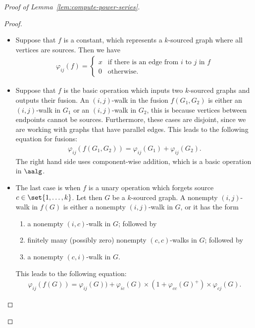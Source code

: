 \begin{proof}[Proof of Lemma~\ref{lem:compute-power-series}]
\begin{proof}
            \begin{itemize}
                \item Suppose that $f$ is a constant, which represents a  $k$-sourced graph where all vertices are sources. Then we have 
                \begin{align*}
                \varphi_{ij}(f) = \begin{cases}
                    x & \text{if there is an edge from $i$ to $j$ in $f$}\\
                    0 & \text{otherwise.}
                \end{cases}
                \end{align*}
                \item Suppose that $f$ is the  basic operation which inputs two $k$-sourced graphs and outputs their fusion.  
                An $(i,j)$-walk in the fusion $f(G_1,G_2)$ is either an $(i,j)$-walk in $G_1$ or an $(i,j)$-walk in $G_2$, this is because vertices between endpoints cannot be sources. Furthermore, these cases are disjoint, since we are working with graphs that have parallel edges.
  		This leads to the following equation for fusions:
                \begin{align*}
					\varphi_{ij}(f(G_1, G_2)) = \varphi_{ij}(G_1) + \varphi_{ij}(G_2).
                \end{align*}
                The right hand side uses component-wise addition, which is a basic operation in $\aalg$.
                \item The last case is when $f$ is a unary operation which forgets  source $c \in \set{1,\ldots,k}$.  Let then $G$ be a $k$-sourced graph. A nonempty $(i,j)$-walk in $f(G)$ is either a nonempty $(i,j)$-walk in $G$, or it has the form
                \begin{enumerate}
                    \item a nonempty $(i,c)$-walk in $G$; followed by 
                    \item finitely many (possibly zero) nonempty  $(c,c)$-walks in $G$; followed by
                    \item a nonempty $(c,i)$-walk in $G$.
                \end{enumerate}
                This leads to the following equation:
                \begin{align*}
                \varphi_{ij}(f(G)) = \varphi_{ij}(G)) +  \varphi_{ic}(G) \times (1+ \varphi_{cc}(G)^+)  \times \varphi_{cj}(G).
                \end{align*}                
            \end{itemize}
        \end{proof}
        
\end{proof}



